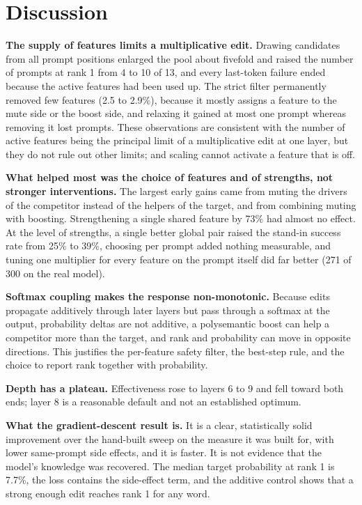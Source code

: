 \documentclass[12pt,a4paper]{report}
\begin{document}
\section{Discussion}\label{sec:discussion}

\textbf{The supply of features limits a multiplicative edit.} Drawing candidates from all prompt positions enlarged the pool about fivefold and raised the number of prompts at rank 1 from 4 to 10 of 13, and every last-token failure ended because the active features had been used up. The strict filter permanently removed few features (2.5 to 2.9\%), because it mostly assigns a feature to the mute side or the boost side, and relaxing it gained at most one prompt whereas removing it lost prompts. These observations are consistent with the number of active features being the principal limit of a multiplicative edit at one layer, but they do not rule out other limits; and scaling cannot activate a feature that is off.

\textbf{What helped most was the choice of features and of strengths, not stronger interventions.} The largest early gains came from muting the drivers of the competitor instead of the helpers of the target, and from combining muting with boosting. Strengthening a single shared feature by 73\% had almost no effect. At the level of strengths, a single better global pair raised the stand-in success rate from 25\% to 39\%, choosing per prompt added nothing measurable, and tuning one multiplier for every feature on the prompt itself did far better (271 of 300 on the real model).

\textbf{Softmax coupling makes the response non-monotonic.} Because edits propagate additively through later layers but pass through a softmax at the output, probability deltas are not additive, a polysemantic boost can help a competitor more than the target, and rank and probability can move in opposite directions. This justifies the per-feature safety filter, the best-step rule, and the choice to report rank together with probability.

\textbf{Depth has a plateau.} Effectiveness rose to layers 6 to 9 and fell toward both ends; layer 8 is a reasonable default and not an established optimum.

\textbf{What the gradient-descent result is.} It is a clear, statistically solid improvement over the hand-built sweep on the measure it was built for, with lower same-prompt side effects, and it is faster. It is not evidence that the model's knowledge was recovered. The median target probability at rank 1 is 7.7\%, the loss contains the side-effect term, and the additive control shows that a strong enough edit reaches rank 1 for any word.
\end{document}
